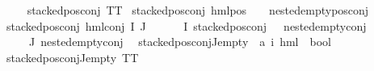 \begin{isabellebody}
\ \ \ \isanewline
{\isachardoublequoteopen}stacked{\isacharunderscore}{\kern0pt}pos{\isacharunderscore}{\kern0pt}conj\ TT{\isachardoublequoteclose}\ {\isacharbar}{\kern0pt}\isanewline
{\isachardoublequoteopen}stacked{\isacharunderscore}{\kern0pt}pos{\isacharunderscore}{\kern0pt}conj\ {\isacharparenleft}{\kern0pt}hml{\isacharunderscore}{\kern0pt}pos\ {\isacharunderscore}{\kern0pt}\ {\isasympsi}{\isacharparenright}{\kern0pt}{\isachardoublequoteclose}\ \ {\isachardoublequoteopen}nested{\isacharunderscore}{\kern0pt}empty{\isacharunderscore}{\kern0pt}pos{\isacharunderscore}{\kern0pt}conj\ {\isasympsi}{\isachardoublequoteclose}\ {\isacharbar}{\kern0pt}\isanewline
{\isachardoublequoteopen}stacked{\isacharunderscore}{\kern0pt}pos{\isacharunderscore}{\kern0pt}conj\ {\isacharparenleft}{\kern0pt}hml{\isacharunderscore}{\kern0pt}conj\ I\ J\ {\isasymPhi}{\isacharparenright}{\kern0pt}{\isachardoublequoteclose}\isanewline
{}\ {\isachardoublequoteopen}{\isasymforall}{\isasymphi}\ {\isasymin}\ {\isacharparenleft}{\kern0pt}{\isasymPhi}\ {\isacharbackquote}{\kern0pt}\ I{\isacharparenright}{\kern0pt}{\isachardot}{\kern0pt}\ {\isacharparenleft}{\kern0pt}{\isacharparenleft}{\kern0pt}stacked{\isacharunderscore}{\kern0pt}pos{\isacharunderscore}{\kern0pt}conj\ {\isasymphi}{\isacharparenright}{\kern0pt}\ {\isasymor}\ nested{\isacharunderscore}{\kern0pt}empty{\isacharunderscore}{\kern0pt}conj\ {\isasymphi}{\isacharparenright}{\kern0pt}{\isachardoublequoteclose}\isanewline
{\isachardoublequoteopen}{\isacharparenleft}{\kern0pt}{\isasymforall}{\isasympsi}\ {\isasymin}\ {\isacharparenleft}{\kern0pt}{\isasymPhi}\ {\isacharbackquote}{\kern0pt}\ J{\isacharparenright}{\kern0pt}{\isachardot}{\kern0pt}\ nested{\isacharunderscore}{\kern0pt}empty{\isacharunderscore}{\kern0pt}conj\ {\isasympsi}{\isacharparenright}{\kern0pt}{\isachardoublequoteclose}\isanewline
\isanewline
{}\isamarkupfalse%
\ stacked{\isacharunderscore}{\kern0pt}pos{\isacharunderscore}{\kern0pt}conj{\isacharunderscore}{\kern0pt}J{\isacharunderscore}{\kern0pt}empty\ {\isacharcolon}{\kern0pt}{\isacharcolon}{\kern0pt}\ {\isachardoublequoteopen}{\isacharparenleft}{\kern0pt}{\isacharprime}{\kern0pt}a{\isacharcomma}{\kern0pt}\ {\isacharprime}{\kern0pt}i{\isacharparenright}{\kern0pt}\ hml\ {\isasymRightarrow}\ bool{\isachardoublequoteclose}\isanewline
\ \ \isanewline
{\isachardoublequoteopen}stacked{\isacharunderscore}{\kern0pt}pos{\isacharunderscore}{\kern0pt}conj{\isacharunderscore}{\kern0pt}J{\isacharunderscore}{\kern0pt}empty\ TT{\isachardoublequoteclose}\ {\isacharbar}{\kern0pt}\isanewline

\end{isabellebody}
